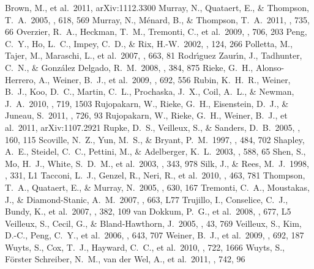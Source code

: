 \documentclass[12pt,preprint]{aastex}
\begin{document}
\begin{thebibliography}{}
  Brown, M., et al.\ 2011, arXiv:1112.3300
 Murray, N., Quataert, E., \&
  Thompson, T.~A.\ 2005, \apj, 618, 569
 Murray, N., M{\'e}nard, B., \&
  Thompson, T.~A.\ 2011, \apj, 735, 66
 Overzier, R.~A., Heckman,
  T.~M., Tremonti, C., et al.\ 2009, \apj, 706, 203
 Peng, C.~Y., Ho, L.~C., Impey,
  C.~D., \& Rix, H.-W.\ 2002, \aj, 124, 266
 Polletta, M., Tajer, M.,
  Maraschi, L., et al.\ 2007, \apj, 663, 81
  Rodr{\'{\i}}guez Zaur{\'{\i}}n, J., Tadhunter, C.~N., \&
  Gonz{\'a}lez Delgado, R.~M.\ 2008, \mnras, 384, 875
 Rieke, G.~H., Alonso-Herrero, A.,
  Weiner, B.~J., et al.\ 2009, \apj, 692, 556
 Rubin, K.~H.~R., Weiner, B.~J.,
  Koo, D.~C., Martin, C.~L., Prochaska, J.~X., Coil, A.~L., \& Newman,
  J.~A.\ 2010, \apj, 719, 1503
 Rujopakarn, W.,
  Rieke, G.~H., Eisenstein, D.~J., \& Juneau, S.\ 2011, \apj, 726, 93
 Rujopakarn, W., Rieke, G.~H.,
  Weiner, B.~J., et al.\ 2011, arXiv:1107.2921
 Rupke, D.~S., Veilleux, S., \&
  Sanders, D.~B.\ 2005, \apjs, 160, 115 
 Scoville, N.~Z., Yun, M.~S., \&
  Bryant, P.~M.\ 1997, \apj, 484, 702
 Shapley, A.~E., Steidel, C.~C.,
  Pettini, M., \& Adelberger, K.~L.\ 2003, \apj, 588, 65
 Shen, S., Mo, H.~J., White,
  S.~D.~M., et al.\ 2003, \mnras, 343, 978
 Silk, J., \& Rees, M.~J.\ 1998,
  \aap, 331, L1
 Tacconi, L.~J., Genzel, R.,
  Neri, R., et al.\ 2010, \nat, 463, 781
 Thompson, T.~A., Quataert, E.,
  \& Murray, N.\ 2005, \apj, 630, 167
 Tremonti, C.~A., Moustakas, J.,
  \& Diamond-Stanic, A.~M.\ 2007, \apjl, 663, L77
 Trujillo, I., Conselice, C.~J.,
  Bundy, K., et al.\ 2007, \mnras, 382, 109
 van Dokkum, P.~G., et
  al.\ 2008, \apjl, 677, L5
 Veilleux, S., Cecil, G., \&
  Bland-Hawthorn, J.\ 2005, \araa, 43, 769
 Veilleux, S., Kim, D.-C., Peng,
  C.~Y., et al.\ 2006, \apj, 643, 707
 Weiner, B.~J., et al.\ 2009,
  \apj, 692, 187
 Wuyts, S., Cox, T.~J., Hayward,
  C.~C., et al.\ 2010, \apj, 722, 1666
 Wuyts, S., F{\"o}rster Schreiber,
  N.~M., van der Wel, A., et al.\ 2011, \apj, 742, 96
\end{thebibliography}
\end{document}
